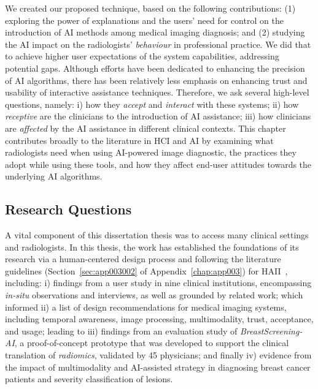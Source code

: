 We created our proposed technique, based on the following contributions:
(1) exploring the power of explanations and the users' need for control on the introduction of \ac{AI} methods among medical imaging diagnosis; and
(2) studying the \ac{AI} impact on the radiologists' {\it behaviour} in professional practice.
We did that to achieve higher user expectations of the system capabilities, addressing potential gaps.
Although efforts have been dedicated to enhancing the precision of \ac{AI} algorithms, there has been relatively less emphasis on enhancing trust and usability of interactive assistance techniques.
Therefore, we ask several high-level questions, namely:
i) how they {\it accept} and {\it interact} with these systems;
ii) how {\it receptive} are the clinicians to the introduction of \ac{AI} assistance;
iii) how clinicians are {\it affected} by the \ac{AI} assistance in different clinical contexts.
This chapter contributes broadly to the literature in \ac{HCI} and \ac{AI} by examining what radiologists need when using \ac{AI}-powered image diagnostic, the practices they adopt while using these tools, and how they affect end-user attitudes towards the underlying \ac{AI} algorithms.

\subsection{Research Questions}
\label{sec:chap005001002}

A vital component of this dissertation thesis was to access many clinical settings and radiologists.
In this thesis, the work has established the foundations of its research via a human-centered design process and following the literature guidelines (Section~\ref{sec:app003002} of Appendix~\ref{chap:app003}) for \ac{HAII}~\cite{10.1145/3313831.3376718, 10.1145/3290605.3300233, 10.1145/3290605.3300234, Kocielnik:2019:YAI:3290605.3300641}, including:
i) findings from a user study in nine clinical institutions, encompassing {\it in-situ} observations and interviews, as well as grounded by related work; which informed
ii) a list of design recommendations for medical imaging systems, including temporal awareness, image processing, multimodality, trust, acceptance, and usage; leading to
iii) findings from an evaluation study of {\it BreastScreening-AI}, a proof-of-concept prototype that was developed to support the clinical translation of {\it radiomics}, validated by 45 physicians; and finally
iv) evidence from the impact of multimodality and \ac{AI}-assisted strategy in diagnosing breast cancer patients and severity classification of lesions.

